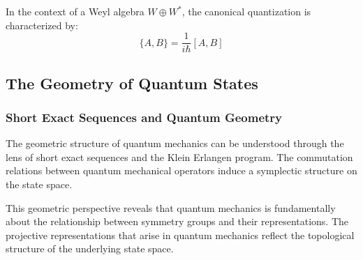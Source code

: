 In the context of a Weyl algebra $W \oplus W^*$, the canonical quantization is characterized by:
\begin{equation}
\{A, B\} = \frac{1}{i\hbar}[A, B]
\end{equation}

\subsection{The Geometry of Quantum States}

\subsubsection{Short Exact Sequences and Quantum Geometry}

The geometric structure of quantum mechanics can be understood through the lens of short exact sequences and the Klein Erlangen program. The commutation relations between quantum mechanical operators induce a symplectic structure on the state space.

This geometric perspective reveals that quantum mechanics is fundamentally about the relationship between symmetry groups and their representations. The projective representations that arise in quantum mechanics reflect the topological structure of the underlying state space.
